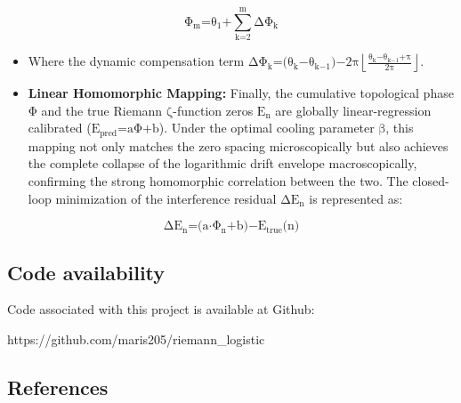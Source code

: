 \[\text{Φ}_{\text{m}}\text{=}\text{θ}_{\text{1}}\text{+}\sum_{\text{k}\text{=2}}^{\text{m}}\text{Δ}\text{Φ}_{\text{k}}\]

\begin{itemize}
\item
  Where the dynamic compensation term
  \(\text{Δ}\text{Φ}_{\text{k}}\text{=(}\text{θ}_{\text{k}}\text{−}\text{θ}_{\text{k}\text{−1}}\text{)−2}\text{π}\left\lfloor \frac{\text{θ}_{\text{k}}\text{−}\text{θ}_{\text{k}\text{−1}}\text{+}\text{π}}{\text{2}\text{π}} \right\rfloor\).
\end{itemize}

\begin{itemize}
\item
  \textbf{Linear Homomorphic Mapping:} Finally, the cumulative
  topological phase \(\text{Φ}\) and the true Riemann
  \(\text{ζ}\)-function zeros \(\text{E}_{\text{n}}\) are globally
  linear-regression calibrated
  (\(\text{E}_{\text{pred}}\text{=}\text{a}\text{Φ+}\text{b}\)). Under
  the optimal cooling parameter \(\text{β}\), this mapping not only
  matches the zero spacing microscopically but also achieves the
  complete collapse of the logarithmic drift envelope macroscopically,
  confirming the strong homomorphic correlation between the two. The
  closed-loop minimization of the interference residual
  \(\text{Δ}\text{E}_{\text{n}}\) is represented as:
\end{itemize}

\[\text{Δ}\text{E}_{\text{n}}\text{=(}\text{a}\text{⋅}\text{Φ}_{\text{n}}\text{+}\text{b}\text{)−}\text{E}_{\text{true}}\text{(}\text{n}\text{)}\]

\hypertarget{code-availability}{%
\subsection{\texorpdfstring{\textbf{Code
availability}}{Code availability}}\label{code-availability}}

Code associated with this project is available at Github:

{https://github.com/maris205/riemann\_logistic}

\hypertarget{references}{%
\subsection{\texorpdfstring{\textbf{References}}{References}}\label{references}}

